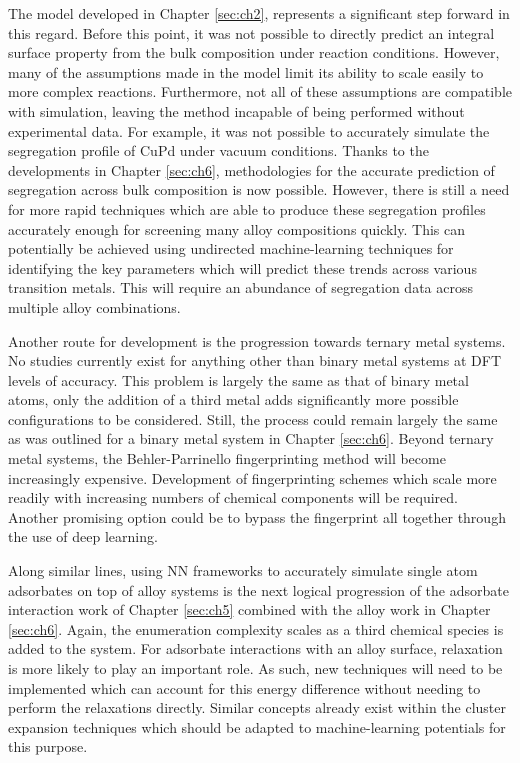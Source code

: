 \documentclass[12pt,oneside]{cmuthesis}
\begin{document}
The model developed in Chapter \ref{sec:ch2}, represents a significant step forward in this regard. Before this point, it was not possible to directly predict an integral surface property from the bulk composition under reaction conditions. However, many of the assumptions made in the model limit its ability to scale easily to more complex reactions. Furthermore, not all of these assumptions are compatible with simulation, leaving the method incapable of being performed without experimental data. For example, it was not possible to accurately simulate the segregation profile of CuPd under vacuum conditions. Thanks to the developments in Chapter \ref{sec:ch6}, methodologies for the accurate prediction of segregation across bulk composition is now possible. However, there is still a need for more rapid techniques which are able to produce these segregation profiles accurately enough for screening many alloy compositions quickly. This can potentially be achieved using undirected machine-learning techniques for identifying the key parameters which will predict these trends across various transition metals. This will require an abundance of segregation data across multiple alloy combinations.



Another route for development is the progression towards ternary metal systems. No studies currently exist for anything other than binary metal systems at DFT levels of accuracy. This problem is largely the same as that of binary metal atoms, only the addition of a third metal adds significantly more possible configurations to be considered. Still, the process could remain largely the same as was outlined for a binary metal system in Chapter \ref{sec:ch6}. Beyond ternary metal systems, the Behler-Parrinello fingerprinting method will become increasingly expensive. Development of fingerprinting schemes which scale more readily with increasing numbers of chemical components will be required. Another promising option could be to bypass the fingerprint all together through the use of deep learning.

Along similar lines, using NN frameworks to accurately simulate single atom adsorbates on top of alloy systems is the next logical progression of the adsorbate interaction work of Chapter \ref{sec:ch5} combined with the alloy work in Chapter \ref{sec:ch6}. Again, the enumeration complexity scales as a third chemical species is added to the system. For adsorbate interactions with an alloy surface, relaxation is more likely to play an important role. As such, new techniques will need to be implemented which can account for this energy difference without needing to perform the relaxations directly. Similar concepts already exist within the cluster expansion techniques which should be adapted to machine-learning potentials for this purpose.
\end{document}
